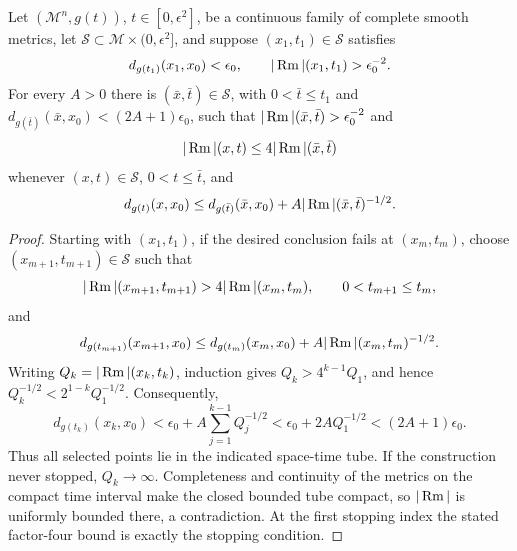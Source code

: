 \begin{proposition}
\label{prop:chow-iii-appj-solution-22-5}
Let \((\mathcal M^n,g(t))\), \(t\in[0,\epsilon^2]\), be a continuous family
of complete smooth metrics, let \(\mathcal S\subset\mathcal M\times
(0,\epsilon^2]\), and suppose \((x_1,t_1)\in\mathcal S\) satisfies
\[
 d_{g(t_1)}(x_1,x_0)<\epsilon_0,
 \qquad |\operatorname{Rm}|(x_1,t_1)>\epsilon_0^{-2}.
\]
For every \(A>0\) there is \((\bar x,\bar t)\in\mathcal S\), with
\(0<\bar t\leq t_1\) and
\(d_{g(\bar t)}(\bar x,x_0)<(2A+1)\epsilon_0\), such that
\(|\operatorname{Rm}|(\bar x,\bar t)>\epsilon_0^{-2}\) and
\[
 |\operatorname{Rm}|(x,t)\leq4|\operatorname{Rm}|(\bar x,\bar t)
\]
whenever \((x,t)\in\mathcal S\), \(0<t\leq\bar t\), and
\[
 d_{g(t)}(x,x_0)\leq d_{g(\bar t)}(\bar x,x_0)
     +A|\operatorname{Rm}|(\bar x,\bar t)^{-1/2}.
\]
\end{proposition}
\begin{proof}
Starting with \((x_1,t_1)\), if the desired conclusion fails at
\((x_m,t_m)\), choose \((x_{m+1},t_{m+1})\in\mathcal S\) such that
\[
 |\operatorname{Rm}|(x_{m+1},t_{m+1})>4|\operatorname{Rm}|(x_m,t_m),
 \qquad 0<t_{m+1}\leq t_m,
\]
and
\[
 d_{g(t_{m+1})}(x_{m+1},x_0)
 \leq d_{g(t_m)}(x_m,x_0)+A|\operatorname{Rm}|(x_m,t_m)^{-1/2}.
\]
Writing \(Q_k=|\operatorname{Rm}|(x_k,t_k)\), induction gives
\(Q_k>4^{k-1}Q_1\), and hence
\(Q_k^{-1/2}<2^{1-k}Q_1^{-1/2}\).  Consequently,
\[
 d_{g(t_k)}(x_k,x_0)
 <\epsilon_0+A\sum_{j=1}^{k-1}Q_j^{-1/2}
 <\epsilon_0+2AQ_1^{-1/2}
 <(2A+1)\epsilon_0.
\]
Thus all selected points lie in the indicated space-time tube.  If the
construction never stopped, \(Q_k\to\infty\).  Completeness and continuity
of the metrics on the compact time interval make the closed bounded tube
compact, so \(|\operatorname{Rm}|\) is uniformly bounded there, a contradiction.  At the
first stopping index the stated factor-four bound is exactly the stopping
condition.
\end{proof}

